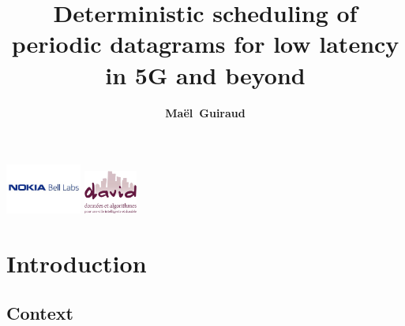 \documentclass[10 pt]{beamer}
\title{Deterministic scheduling of periodic datagrams for low latency in 5G and beyond}
\author{{\bf Maël~Guiraud}}
\institute[Nokia Bell Labs, DAVID-UVSQ] 
{
  Nokia Bell Labs France - DAVID, Universit\'e de Versailles Saint Quentin
   \\
}
\begin{document}
\begin{frame}

  \titlepage
  \centering
  \includegraphics [width=25mm]{logon.png} \hspace{1cm} \includegraphics [width=17.5mm]{logod.png} \\
\end{frame}




\section{Introduction }
\subsection{Context }
\end{document}
